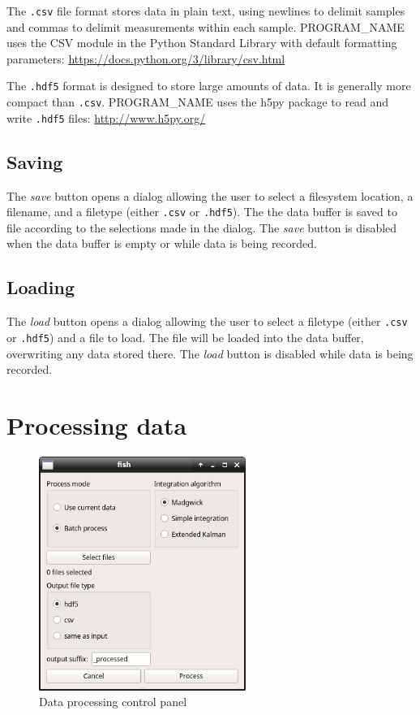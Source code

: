 \documentclass[11pt,letterpaper,article,oneside]{memoir}
\newcommand{\name}{PROGRAM\_NAME}
\newcommand{\csv}{\texttt{.csv}}
\newcommand{\hdf}{\texttt{.hdf5}}
\begin{document}
\label{sec:fileformats}
The \csv{} file format stores data in plain text, using newlines to delimit
samples and commas to delimit measurements within each sample.  \name{} uses the
CSV module in the Python Standard Library with default formatting parameters:
\url{https://docs.python.org/3/library/csv.html}

The \hdf{} format is designed to store large amounts of data. It is generally more
compact than \csv{}. \name{} uses the h5py package to read and write \hdf{} files:
\url{http://www.h5py.org/}


\section{Saving}

The \emph{save} button opens a dialog allowing the user to select a filesystem
location, a filename, and a filetype (either \csv{} or \hdf{}).  The the data
buffer is saved to file according to the selections made in the dialog. The
\emph{save} button is disabled when the data buffer is empty or while data is
being recorded.

\section{Loading}

The \emph{load} button opens a dialog allowing the user to select a filetype
(either \csv{} or \hdf{}) and a file to load. The file will be loaded into the
data buffer, overwriting any data stored there.  The \emph{load} button is
disabled while data is being recorded.


\chapter{Processing data}

\begin{figure}[]
    \begin{center}
        \includegraphics[height=3in]{screenshot_process}
    \end{center}
    \caption{Data processing control panel} 
    \label{fig:control}
\end{figure}
\end{document}
